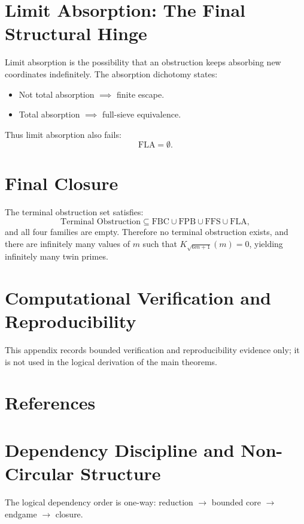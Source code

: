 \documentclass[11pt,a4paper]{article}
\begin{document}
\section{Limit Absorption: The Final Structural Hinge}
Limit absorption is the possibility that an obstruction keeps absorbing new coordinates indefinitely. The absorption dichotomy states:
\begin{itemize}
    \item Not total absorption \(\implies\) finite escape.
    \item Total absorption \(\implies\) full-sieve equivalence.
\end{itemize}

Thus limit absorption also fails:
\[
\mathrm{FLA} = \emptyset.
\]

\section{Final Closure}
The terminal obstruction set satisfies:
\[
\text{Terminal Obstruction} \subseteq \mathrm{FBC} \cup \mathrm{FPB} \cup \mathrm{FFS} \cup \mathrm{FLA},
\]
and all four families are empty. Therefore no terminal obstruction exists, and there are infinitely many values of \(m\) such that \(K_{\sqrt{6m+1}}(m) = 0\), yielding infinitely many twin primes.

\appendix
\section{Computational Verification and Reproducibility}
This appendix records bounded verification and reproducibility evidence only; it is not used in the logical derivation of the main theorems.

\section{References}

\section{Dependency Discipline and Non-Circular Structure}
The logical dependency order is one-way: reduction \(\to\) bounded core \(\to\) endgame \(\to\) closure.

\end{document}
